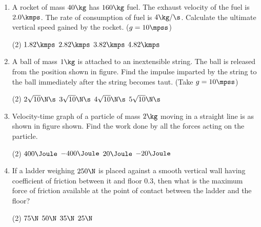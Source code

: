 \documentclass{article}
\newcommand{\ans}{\textcolor{red!95}{\textit{\quad}}}
\begin{document}
\begin{enumerate}
\item A rocket of mass $40 \kg$ has $160 \kg$ fuel. The exhaust velocity of the fuel is $2.0 \kmps$. The rate of consumption of fuel is $4 \kg/\s$. Calculate the ultimate vertical speed gained by the rocket. ($g = 10 \mpss$)
\begin{tasks}(2)
	\task $1.82\kmps$
	\task $2.82\kmps$\ans
	\task $3.82\kmps$
	\task $4.82\kmps$
\end{tasks}

\item A ball of mass $1 \kg$ is attached to an inextensible string. The ball is released from the position shown in figure. Find the impulse imparted by the string to the ball immediately after the string becomes taut. (Take $g = 10 \mpss$)
\begin{center}
\end{center}
\begin{tasks}(2)
	\task $2\sqrt{10}\N\s$\ans
	\task $3\sqrt{10}\N\s$
	\task $4\sqrt{10}\N\s$
	\task $5\sqrt{10}\N\s$
\end{tasks}

\item Velocity-time graph of a particle of mass $2 \kg$ moving in a straight line is as shown in figure shown. Find the work done by all the forces acting on the particle.
\begin{center}
\end{center}
\begin{tasks}(2)
	\task $400\Joule$
	\task $-400\Joule$\ans
	\task $20\Joule$
	\task $-20\Joule$
\end{tasks}

\item If a ladder weighing $250 \N$ is placed against a smooth vertical wall having coefficient of friction between it and floor $0.3$, then what is the maximum force of friction available at the point of contact between the ladder and the floor?
\begin{tasks}(2)
	\task $75\N$
	\task $50\N$
	\task $35\N$
	\task $25\N$\ans
\end{tasks}


\end{enumerate}
\end{document}
